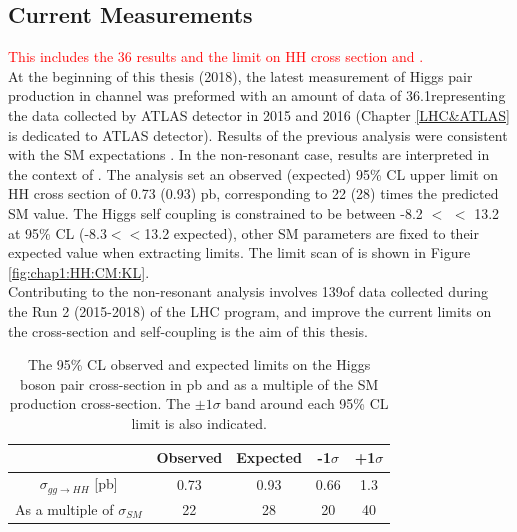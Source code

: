 \subsection{Current Measurements}
\label{chap1:HH:CM}
\textcolor{red}{This includes the 36 \ifb results and the limit on HH cross section and \kl.} \\
At the beginning of this thesis (2018), the latest measurement of Higgs pair production in \HHyybb channel was preformed with an amount of data of 36.1\ifb representing the data collected by ATLAS detector in 2015 and 2016 (Chapter \ref{LHC&ATLAS} is dedicated to ATLAS detector). Results of the previous analysis were consistent with the SM expectations \cite{yybb_36ifb}. In the non-resonant case, results are interpreted in the context of \kl. The analysis set an observed (expected) 95\% CL upper limit on HH cross section of 0.73 (0.93) pb, corresponding to 22 (28) times the predicted SM value. The Higgs self coupling is constrained to be between -8.2 $<$ \kl $<$ 13.2 at 95\% CL (-8.3$<$\kl$<$13.2 expected), other SM parameters are fixed to their expected value when extracting limits. The limit scan of \kl is shown in Figure \ref{fig:chap1:HH:CM:KL}. \\
Contributing to the \HHyybb non-resonant analysis involves 139\ifb of data collected during the Run 2 (2015-2018) of the LHC program, and improve the current limits on the cross-section and self-coupling is the aim of this thesis. 
\begin{table}[H]
    \centering
    \begin{tabular}{ccccc}
    \hline
         & Observed & Expected & -1$\sigma$ & +1$\sigma$ \\
    \hline
        $\sigma_{gg\rightarrow HH}$ [pb] & 0.73 & 0.93 & 0.66 & 1.3 \\
        As a multiple of $\sigma_{SM}$ & 22 & 28 & 20 & 40 \\
        \hline
    \end{tabular}
    \caption{The 95\% CL observed and expected limits on the Higgs boson pair cross-section in pb and as a multiple of the SM production cross-section. The $\pm1\sigma$ band around each 95\% CL limit is also indicated.}
    \label{tab:chap1:HH:CM:XSEC}
\end{table}

